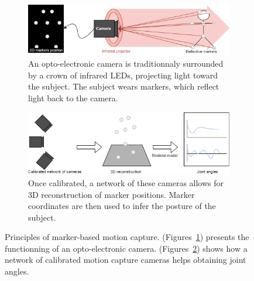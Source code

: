 \begin{figure}[hbtp]
	\centering
	\begin{subfigure}[b]{1\textwidth}
		\centering
		\def\svgwidth{\columnwidth}
		\fontsize{10pt}{10pt}\selectfont
		\includegraphics[width=\linewidth]{"../Chap1/Figures/Markers_1.png"}
		\caption{An opto-electronic camera is traditionnaly surrounded by a crown of infrared LEDs, projecting light toward the subject. The subject wears markers, which reflect light back to the camera.}
		\label{fig_mk1}
	\end{subfigure}
	\qquad
	\begin{subfigure}[b]{1\textwidth}
		\centering
		\def\svgwidth{\columnwidth}
		\fontsize{10pt}{10pt}\selectfont
		\includegraphics[width=\linewidth]{"../Chap1/Figures/Markers_2.png"}
		\caption{Once calibrated, a network of these cameras allows for 3D reconstruction of marker positions. Marker coordinates are then used to infer the posture of the subject.}
		\label{fig_mk2}
	\end{subfigure}
	\caption{Principles of marker-based motion capture. (Figures~\ref{fig_mk1}) presents the functionning of an opto-electronic camera. (Figures~\ref{fig_mk2}) shows how a network of calibrated motion capture cameras helps obtaining joint angles.}
	\label{fig_mk}
\end{figure}


